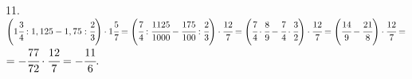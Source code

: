 11. $\left(1\cfrac{3}{4}:1,125-1,75:\cfrac{2}{3}\right)\cdot1\cfrac{5}{7}=
\left(\cfrac{7}{4}:\cfrac{1125}{1000}-\cfrac{175}{100}:\cfrac{2}{3}\right)\cdot\cfrac{12}{7}=
\left(\cfrac{7}{4}\cdot\cfrac{8}{9}-\cfrac{7}{4}\cdot\cfrac{3}{2}\right)\cdot\cfrac{12}{7}=
\left(\cfrac{14}{9}-\cfrac{21}{8}\right)\cdot\cfrac{12}{7}=$\\$=-\cfrac{77}{72}\cdot\cfrac{12}{7}=-\cfrac{11}{6}.$\\
